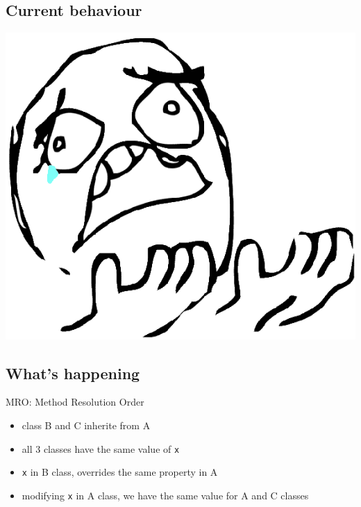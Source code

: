 \documentclass{beamer}
\begin{document}
\subsection{Current behaviour}
\begin{frame}[fragile]
\begin{center}
\structure{\insertsection}
\end{center}

\pause 
\pause 
\pause 
\pause 
\pause 
\end{frame}
\begin{frame}
    \begin{center}
        \includegraphics[width=1\textwidth]{images/why.png}
    \end{center}
\end{frame}
\subsection{What's happening}
\begin{frame}
MRO: Method Resolution Order \\
\begin{itemize}
\item class B and C inherite from A
\item all 3 classes have the same value of \texttt{x}
\item \texttt{x} in B class, overrides the same property in A
\item modifying \texttt{x} in A class, we have the same value for A and C classes
\end{itemize}
\end{frame}
\end{document}
